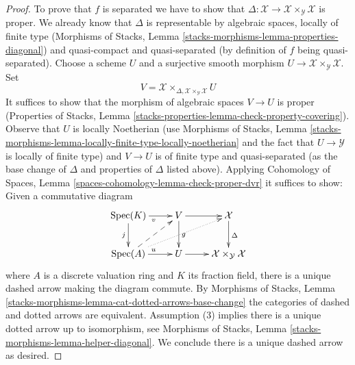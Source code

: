 \begin{proof}
To prove that $f$ is separated we have to show that
$\Delta : \mathcal{X} \to \mathcal{X} \times_\mathcal{Y} \mathcal{X}$
is proper. We already know that $\Delta$ is representable by
algebraic spaces, locally of finite type (Morphisms of Stacks,
Lemma \ref{stacks-morphisms-lemma-properties-diagonal}) and
quasi-compact and quasi-separated (by definition of $f$ being quasi-separated).
Choose a scheme $U$ and a surjective smooth morphism
$U \to \mathcal{X} \times_\mathcal{Y} \mathcal{X}$.
Set
$$
V = \mathcal{X} \times_{\Delta, \mathcal{X} \times_\mathcal{Y} \mathcal{X}} U
$$
It suffices to show that the morphism of algebraic spaces $V \to U$
is proper (Properties of Stacks, Lemma
\ref{stacks-properties-lemma-check-property-covering}).
Observe that $U$ is locally Noetherian
(use Morphisms of Stacks, Lemma
\ref{stacks-morphisms-lemma-locally-finite-type-locally-noetherian}
and the fact that $U \to \mathcal{Y}$ is locally of finite type)
and $V \to U$
is of finite type and quasi-separated (as the base change
of $\Delta$ and properties of $\Delta$ listed above). Applying
Cohomology of Spaces, Lemma \ref{spaces-cohomology-lemma-check-proper-dvr}
it suffices to show: Given a commutative diagram
$$
\xymatrix{
\Spec(K) \ar[r]_v \ar[d]_j &
V \ar[d]^g \ar[r] &
\mathcal{X} \ar[d]^\Delta \\
\Spec(A) \ar[r]^u \ar@{-->}[ru] \ar@{..>}[rru] &
U \ar[r] &
\mathcal{X} \times_\mathcal{Y} \mathcal{X}
}
$$
where $A$ is a discrete valuation ring and $K$ its fraction field,
there is a unique dashed arrow making the diagram commute.
By Morphisms of Stacks, Lemma
\ref{stacks-morphisms-lemma-cat-dotted-arrows-base-change}
the categories of dashed and dotted arrows are equivalent.
Assumption (3) implies there is a unique dotted arrow up to
isomorphism, see Morphisms of Stacks, Lemma
\ref{stacks-morphisms-lemma-helper-diagonal}. We conclude
there is a unique dashed arrow as desired.
\end{proof}

